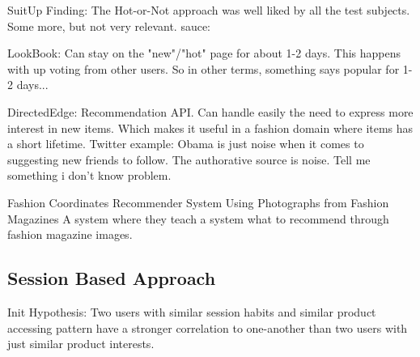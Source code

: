 SuitUp Finding:
The Hot-or-Not approach was well liked by all the test subjects.  Some more,
but not very relevant.
sauce:\cite{SuitUp}

LookBook:
Can stay on the "new"/"hot" page for about 1-2 days.
This happens with up voting from other users.
So in other terms, something says popular for 1-2 days...

DirectedEdge:
Recommendation API.
Can handle easily the need to express more interest in new items.  Which makes
it useful in a fashion domain where items has a short lifetime.
Twitter example: Obama is just noise when it comes to suggesting new friends to
follow.  The authorative source is noise.  Tell me something i don't know
problem.

Fashion Coordinates Recommender System Using Photographs from Fashion Magazines
\cite{Iwata:2011} A system where they teach a system what to recommend through
fashion magazine images.







\subsection{Session Based Approach}
Init Hypothesis:
Two users with similar session habits and similar product accessing pattern
have a stronger correlation to one-another than two users with just similar
product interests.


